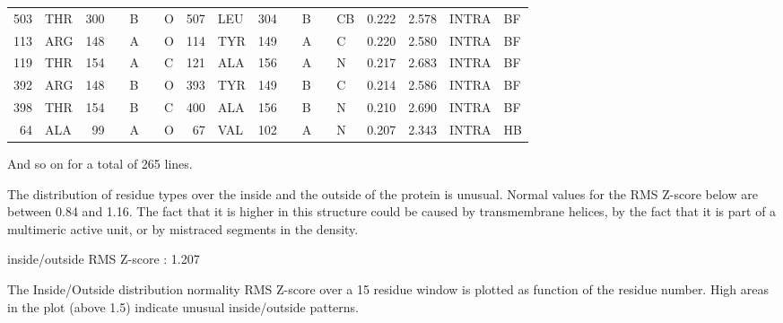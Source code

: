 \begin{error}
\begin{center}
\begin{supertabular}{rl@{ (}r@{}c@{) }l@{}rl@{ -- }rl@{ (}r@{}c@{) }l@{}rlrrll}
 503&THR & 300& &B&  & O    & 507&LEU & 304& &B&  & CB   &  0.222&  2.578&INTRA&BF\\
 113&ARG & 148& &A&  & O    & 114&TYR & 149& &A&  & C    &  0.220&  2.580&INTRA&BF\\
 119&THR & 154& &A&  & C    & 121&ALA & 156& &A&  & N    &  0.217&  2.683&INTRA&BF\\
 392&ARG & 148& &B&  & O    & 393&TYR & 149& &B&  & C    &  0.214&  2.586&INTRA&BF\\
 398&THR & 154& &B&  & C    & 400&ALA & 156& &B&  & N    &  0.210&  2.690&INTRA&BF\\
  64&ALA &  99& &A&  & O    &  67&VAL & 102& &A&  & N    &  0.207&  2.343&INTRA&HB\\
\end{supertabular}\end{center}
And so on for a total of   265 lines.
\end{error}

\begin{warning}
The distribution of residue types over the inside and the outside of the
protein is unusual. Normal values for the RMS Z-score below are between
0.84 and 1.16. The fact that it is higher in this structure could be
caused by transmembrane helices, by the fact that it is part of a
multimeric active unit, or by mistraced segments in the density.

\parbox{1\textwidth}{
inside/outside RMS Z-score : 1.207
}%

\end{warning}

\begin{note}
The Inside/Outside distribution normality RMS Z-score over a 15
residue window is plotted as function of the residue number. High
areas in the plot (above 1.5) indicate unusual inside/outside
patterns.

\parbox{1\textwidth}{
}%


\parbox{1\textwidth}{
}%

\end{note}

\begin{note}


\parbox{1\textwidth}{
}%


\parbox{1\textwidth}{
}%

\end{note}

